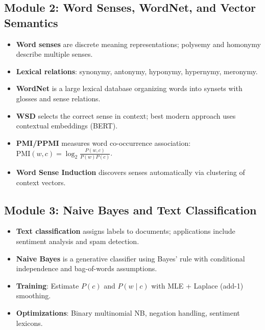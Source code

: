 \documentclass[11pt,a4paper]{article}
\begin{document}
\subsection{Module 2: Word Senses, WordNet, and Vector Semantics}
\begin{itemize}
    \item \textbf{Word senses} are discrete meaning representations; polysemy and homonymy describe multiple senses.
    \item \textbf{Lexical relations}: synonymy, antonymy, hyponymy, hypernymy, meronymy.
    \item \textbf{WordNet} is a large lexical database organizing words into synsets with glosses and sense relations.
    \item \textbf{WSD} selects the correct sense in context; best modern approach uses contextual embeddings (BERT).
    \item \textbf{PMI/PPMI} measures word co-occurrence association: $\text{PMI}(w, c) = \log_2 \frac{P(w, c)}{P(w)P(c)}$.
    \item \textbf{Word Sense Induction} discovers senses automatically via clustering of context vectors.
\end{itemize}

\subsection{Module 3: Naive Bayes and Text Classification}
\begin{itemize}
    \item \textbf{Text classification} assigns labels to documents; applications include sentiment analysis and spam detection.
    \item \textbf{Naive Bayes} is a generative classifier using Bayes' rule with conditional independence and bag-of-words assumptions.
    \item \textbf{Training}: Estimate $P(c)$ and $P(w \mid c)$ with MLE + Laplace (add-1) smoothing.
    \item \textbf{Optimizations}: Binary multinomial NB, negation handling, sentiment lexicons.
\end{itemize}
\end{document}
